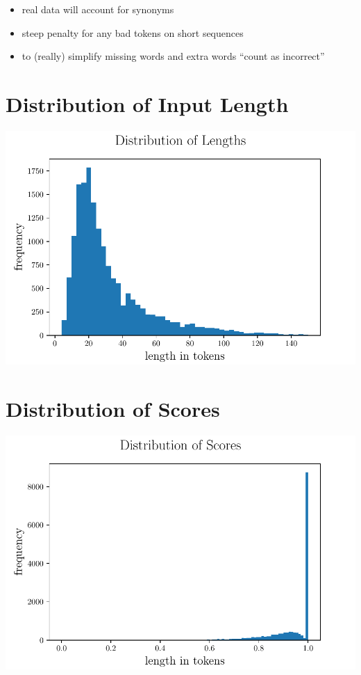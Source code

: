 \begin{itemize}
\item
  real data will account for synonyms
\item
  steep penalty for any bad tokens on short sequences
\item
  to (really) simplify missing words and extra words ``count as
  incorrect''
\end{itemize}

\hypertarget{distribution-of-input-length}{%
\section{Distribution of Input
Length}\label{distribution-of-input-length}}

\includegraphics{assets/histogram.pdf}

\hypertarget{distribution-of-scores}{%
\section{Distribution of Scores}\label{distribution-of-scores}}

\includegraphics{assets/scorehistogram.pdf}

